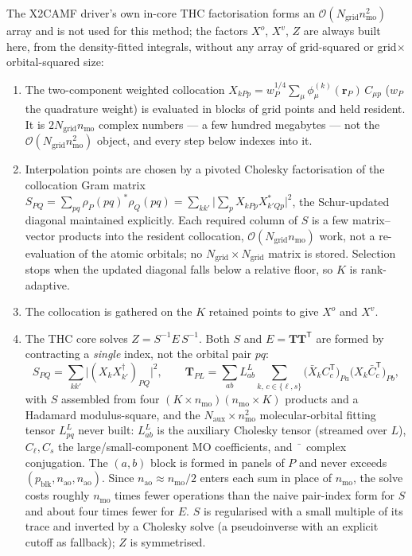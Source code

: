\documentclass[aip,jcp,amsmath,amssymb,preprint,superscriptaddress]{revtex4-2}%
\newcommand{\Naux}{N_{\mathrm{aux}}}
\newcommand{\Ngrid}{N_{\mathrm{grid}}}
\newcommand{\rr}{\mathbf{r}}
\newcommand{\Ord}[1]{\mathcal{O}\!\left(#1\right)}
\begin{document}
The X2CAMF driver's own in-core THC factorisation forms an
$\Ord{\Ngrid n_{\mathrm{mo}}^{2}}$ array and is not used for this method;
the factors $X^{o}$, $X^{v}$, $Z$ are always built here, from the
density-fitted integrals, without any array of grid-squared or
grid$\times$orbital-squared size:
\begin{enumerate}
\item The two-component weighted collocation
  $X_{kPp}=w_P^{1/4}\sum_{\mu}\phi^{(k)}_{\mu}(\rr_P)\,C_{\mu p}$
  ($w_P$ the quadrature weight) is evaluated in blocks of grid points and
  held resident. It is $2\Ngrid n_{\mathrm{mo}}$ complex numbers --- a few
  hundred megabytes --- not the $\Ord{\Ngrid n_{\mathrm{mo}}^{2}}$ object,
  and every step below indexes into it.
\item Interpolation points are chosen by a pivoted Cholesky factorisation of
  the collocation Gram matrix
  $S_{PQ}=\sum_{pq}\rho_{P}(pq)^{*}\rho_{Q}(pq)
        =\sum_{kk'}\bigl|\textstyle\sum_p X_{kPp}X^{*}_{k'Qp}\bigr|^{2}$,
  the Schur-updated diagonal maintained explicitly. Each required column of
  $S$ is a few matrix--vector products into the resident collocation,
  $\Ord{\Ngrid n_{\mathrm{mo}}}$ work, not a re-evaluation of the atomic
  orbitals; no $\Ngrid\times\Ngrid$ matrix is stored. Selection stops when
  the updated diagonal falls below a relative floor, so $K$ is
  rank-adaptive.
\item The collocation is gathered on the $K$ retained points to give
  $X^{o}$ and $X^{v}$.
\item The THC core solves $Z = S^{-1} E\, S^{-1}$. Both $S$ and
  $E=\mathbf{T}\mathbf{T}^{\mathsf T}$ are formed by contracting a
  \emph{single} index, not the orbital pair $pq$:
  \begin{equation}
    S_{PQ}=\sum_{kk'}\bigl|(X_{k}X_{k'}^{\dagger})_{PQ}\bigr|^{2},
    \qquad
    \mathbf{T}_{PL}
      = \sum_{ab} L^{L}_{ab}
        \sum_{k,\,c\in\{\ell,s\}}
        \bigl(\bar X_{k}C_{c}^{\mathsf T}\bigr)_{\!Pa}
        \bigl(X_{k}\bar C_{c}^{\mathsf T}\bigr)_{\!Pb},
    \label{eq:lsthc}
  \end{equation}
  with $S$ assembled from four $(K\times n_{\mathrm{mo}})(n_{\mathrm{mo}}
  \times K)$ products and a Hadamard modulus-square, and the
  $\Naux\times n_{\mathrm{mo}}^{2}$ molecular-orbital fitting tensor
  $L^{L}_{pq}$ never built: $L^{L}_{ab}$ is the auxiliary Cholesky tensor
  (streamed over $L$), $C_{\ell},C_{s}$ the large/small-component MO
  coefficients, and $\bar{\phantom{x}}$ complex conjugation. The $(a,b)$
  block is formed in panels of $P$ and never exceeds
  $(p_{\mathrm{blk}}, n_{\mathrm{ao}}, n_{\mathrm{ao}})$. Since
  $n_{\mathrm{ao}}\approx n_{\mathrm{mo}}/2$ enters each sum in place of
  $n_{\mathrm{mo}}$, the solve costs roughly $n_{\mathrm{mo}}$ times fewer
  operations than the naive pair-index form for $S$ and about four times
  fewer for $E$. $S$ is regularised with a small multiple of its trace and
  inverted by a Cholesky solve (a pseudoinverse with an explicit cutoff as
  fallback); $Z$ is symmetrised.
\end{enumerate}
\end{document}
